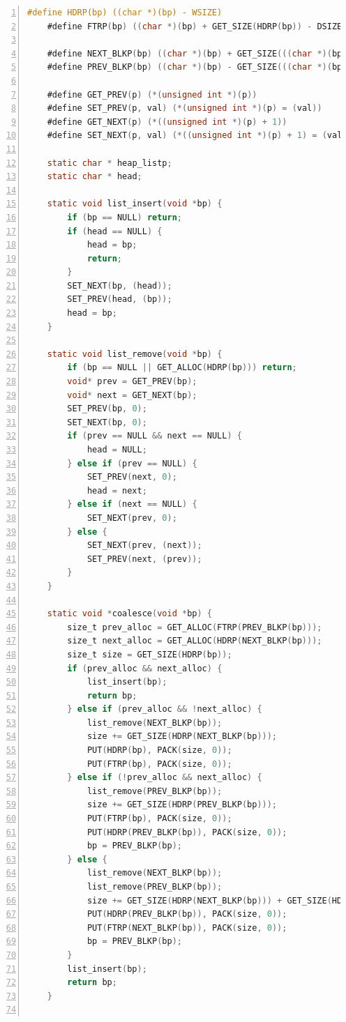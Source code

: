 \documentclass{article}
\begin{document}
\begin{lstlisting}[xleftmargin = 4em,xrightmargin = 3em, aboveskip = 1em, numbers = left, language = C]
    #define HDRP(bp) ((char *)(bp) - WSIZE)
    #define FTRP(bp) ((char *)(bp) + GET_SIZE(HDRP(bp)) - DSIZE)

    #define NEXT_BLKP(bp) ((char *)(bp) + GET_SIZE(((char *)(bp) - WSIZE)))
    #define PREV_BLKP(bp) ((char *)(bp) - GET_SIZE(((char *)(bp) - DSIZE)))

    #define GET_PREV(p) (*(unsigned int *)(p))
    #define SET_PREV(p, val) (*(unsigned int *)(p) = (val))
    #define GET_NEXT(p) (*((unsigned int *)(p) + 1))
    #define SET_NEXT(p, val) (*((unsigned int *)(p) + 1) = (val))

    static char * heap_listp;
    static char * head;

    static void list_insert(void *bp) {
        if (bp == NULL) return;
        if (head == NULL) {
            head = bp;
            return;
        }
        SET_NEXT(bp, (head));
        SET_PREV(head, (bp));
        head = bp;
    }

    static void list_remove(void *bp) {
        if (bp == NULL || GET_ALLOC(HDRP(bp))) return;
        void* prev = GET_PREV(bp);
        void* next = GET_NEXT(bp);
        SET_PREV(bp, 0);
        SET_NEXT(bp, 0);
        if (prev == NULL && next == NULL) {
            head = NULL;
        } else if (prev == NULL) {
            SET_PREV(next, 0);
            head = next;
        } else if (next == NULL) {
            SET_NEXT(prev, 0);
        } else {
            SET_NEXT(prev, (next));
            SET_PREV(next, (prev));
        } 
    }

    static void *coalesce(void *bp) {
        size_t prev_alloc = GET_ALLOC(FTRP(PREV_BLKP(bp)));
        size_t next_alloc = GET_ALLOC(HDRP(NEXT_BLKP(bp)));
        size_t size = GET_SIZE(HDRP(bp));
        if (prev_alloc && next_alloc) {
            list_insert(bp);
            return bp;
        } else if (prev_alloc && !next_alloc) {
            list_remove(NEXT_BLKP(bp));
            size += GET_SIZE(HDRP(NEXT_BLKP(bp)));
            PUT(HDRP(bp), PACK(size, 0));
            PUT(FTRP(bp), PACK(size, 0));
        } else if (!prev_alloc && next_alloc) {
            list_remove(PREV_BLKP(bp));
            size += GET_SIZE(HDRP(PREV_BLKP(bp)));
            PUT(FTRP(bp), PACK(size, 0));
            PUT(HDRP(PREV_BLKP(bp)), PACK(size, 0));
            bp = PREV_BLKP(bp);
        } else {
            list_remove(NEXT_BLKP(bp));
            list_remove(PREV_BLKP(bp));
            size += GET_SIZE(HDRP(NEXT_BLKP(bp))) + GET_SIZE(HDRP(PREV_BLKP(bp)));
            PUT(HDRP(PREV_BLKP(bp)), PACK(size, 0));
            PUT(FTRP(NEXT_BLKP(bp)), PACK(size, 0));
            bp = PREV_BLKP(bp);
        }
        list_insert(bp);
        return bp;
    }


\end{lstlisting}
\end{document}
